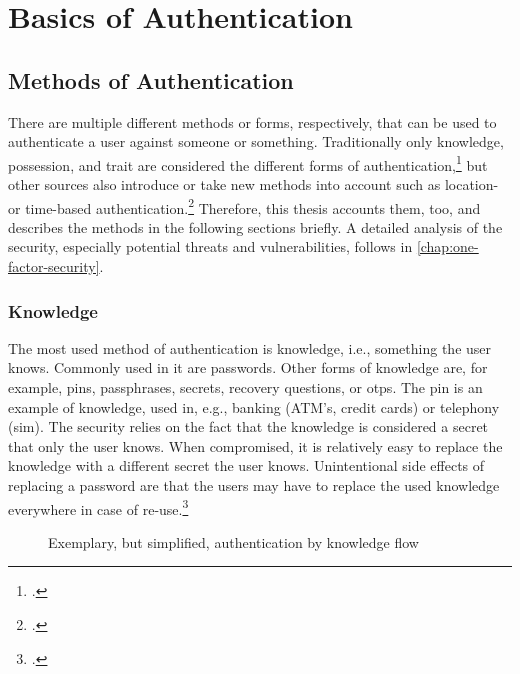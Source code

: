 \chapter{Basics of Authentication}
\label{chapter:basics}

\section{Methods of Authentication}
There are multiple different methods or forms, respectively, that can be used to authenticate a user against someone or something. Traditionally only knowledge, possession, and trait are considered the different forms of authentication,\footcites[See][299]{10.2307/27845364}[See][140]{brotherston2017defensive}[See][47]{anderson2008security} but other sources also introduce or take new methods into account such as location- or time-based authentication.\footcites[See][]{6296127}[See][191]{dasgupta2017multi} Therefore, this thesis accounts them, too, and describes the methods in the following sections briefly. A detailed analysis of the security, especially potential threats and vulnerabilities, follows in \autoref{chap:one-factor-security}.

\subsection{Knowledge}

The most used method of authentication is knowledge, i.e., \frqq something the user knows\flqq{}. Commonly used in \gls{it} are passwords. Other forms of knowledge are, for example, \glspl{pin}, passphrases, secrets, recovery questions, or \glspl{otp}. The \gls{pin} is an example of knowledge, used in, e.g., banking (ATM's, credit cards) or telephony (\gls{sim}). The security relies on the fact that the knowledge is considered a secret that only the user knows. When compromised, it is relatively easy to replace the knowledge with a different secret the user knows. Unintentional side effects of replacing a password are that the users may have to replace the used knowledge everywhere in case of re-use.\footcite[See][467]{eckert-it-sec-9}

\newpage

\begin{figure}[hbt]
	\centering
	
	\caption[Exemplary, but simplified, authentication by knowledge flow]{Exemplary, but simplified, authentication by knowledge flow\footnotemark}
	\label{fig:knowledge_auth_flow}
\end{figure}

